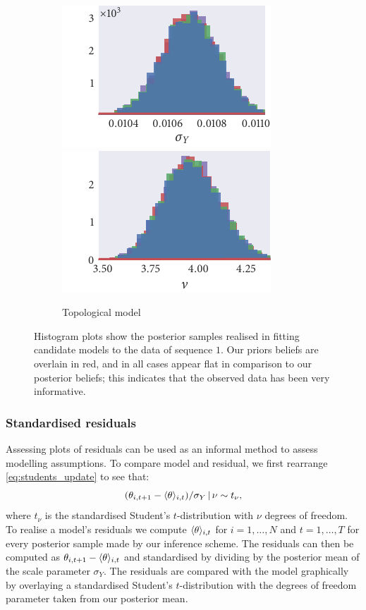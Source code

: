 \begin{figure}[p]
\begin{subfigure}[b]{\textwidth}
    \includegraphics{seq1/top_hist_sigma_Y.pdf}%
    \includegraphics{seq1/top_hist_nu.pdf}%
    \caption{Topological model}
    \label{subfig:posterior_seq1_top}
  \end{subfigure}
  \vspace{-1.5em}
  \caption{Histogram plots show the posterior samples realised in fitting
    candidate models to the data of sequence $1$. Our priors beliefs are overlain
    in red, and in all cases appear flat in comparison to our posterior
    beliefs; this indicates that the observed data has been very informative.}
  \label{fig:posteriors_seq1}
\end{figure}

\subsubsection{Standardised residuals}

Assessing plots of residuals can be used as an informal method to assess
modelling assumptions. To compare model and residual, we first rearrange
\cref{eq:students_update} to see that:
\begin{equation}
  \label{eq:residuals}
  (\theta_{i,t+1} - \langle\theta\rangle_{i,t}) / \sigma_Y \,|\, \nu \sim t_{\nu},
\end{equation}
where $t_{\nu}$ is the standardised Student's $t$-distribution with $\nu$
degrees of freedom. To realise a model's residuals we compute
$\langle\theta\rangle_{i,t}$ for $i=1,\ldots,N$ and $t=1,\ldots,T$ for every
posterior sample made by our inference scheme. The residuals can then be
computed as $\theta_{i,t+1} - \langle\theta\rangle_{i,t}$ and standardised by
dividing by the posterior mean of the scale parameter $\sigma_Y$. The residuals
are compared with the model graphically by overlaying a standardised Student's
$t$-distribution with the degrees of freedom parameter taken from our posterior
mean.

